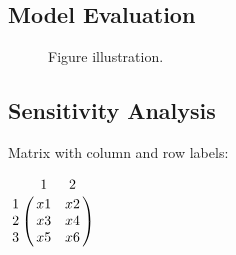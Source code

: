 \documentclass[11pt,a4]{article}
\begin{document}
\subsection{Model Evaluation}


\begin{figure}[H]
\caption{Figure illustration.}
\label{Figure_Flyer}
\end{figure}



\subsection{Sensitivity Analysis}

Matrix with column and row labels:

$\bordermatrix{
& 1 & 2 \cr
1 & x1 & x2 \cr
2 & x3 & x4 \cr
3 & x5 & x6
}$


\addtocounter{MaxMatrixCols}{24}
\end{document}
